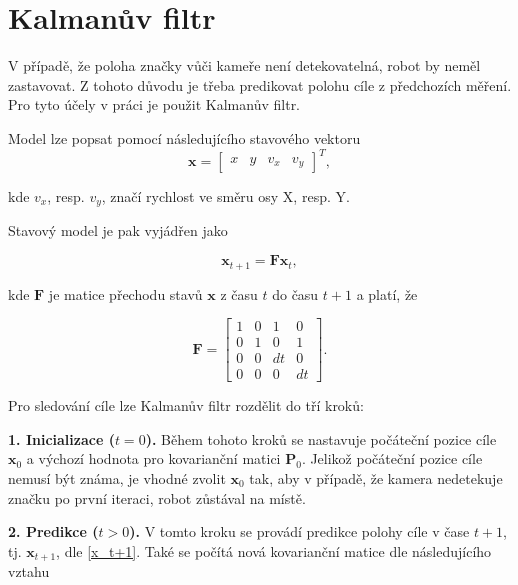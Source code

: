 \documentclass[twoside]{ctuthesis}
\theoremstyle{plain}
\theoremstyle{definition}
\theoremstyle{note}
\begin{document}
\section{Kalmanův filtr}
\label{kalman_section}
V případě, že poloha značky vůči kameře není detekovatelná, robot by neměl zastavovat. Z tohoto důvodu je třeba predikovat polohu cíle z předchozích měření. Pro tyto účely v práci je použit Kalmanův filtr. 

Model lze popsat pomocí následujícího stavového vektoru
\begin{equation}
{\boldsymbol{x}} = 
\begin{bmatrix}
x&y&v_{x}&v_{y}
\end{bmatrix}^T,
\end{equation}

kde $v_{x}$, resp. $v_{y}$, značí rychlost ve směru osy X, resp. Y.


Stavový model je pak vyjádřen jako

\begin{equation}
\label{x_t+1}
{\boldsymbol{x}}_{t+1} = \boldsymbol{F}{\boldsymbol{x}}_{t},
\end{equation}

kde $\boldsymbol{F}$ je matice přechodu stavů $\boldsymbol{x}$ z času $t$ do času $t + 1$ a platí, že

\begin{equation}
\boldsymbol{F} = \begin{bmatrix}
1&0&1&0\\
0&1&0&1\\
0&0&dt&0\\
0&0&0&dt
\end{bmatrix}.
\end{equation}

Pro sledování cíle lze Kalmanův filtr rozdělit do tří kroků:

\textbf{1.  Inicializace ($t = 0$).} Během tohoto kroků se nastavuje počáteční pozice cíle $\boldsymbol{x}_0$ a výchozí hodnota pro kovarianční matici $\boldsymbol{P}_0$. Jelikož počáteční pozice cíle nemusí být známa, je vhodné zvolit $\boldsymbol{x}_0$ tak, aby v případě, že kamera nedetekuje značku po první iteraci, robot zůstával na místě.

\textbf{2. Predikce ($t > 0$).} V tomto kroku se provádí predikce polohy cíle v čase $t + 1$, tj. $\boldsymbol{x}_{t+1}$, dle \ref{x_t+1}. Také se počítá nová kovarianční matice dle následujícího vztahu
\end{document}
